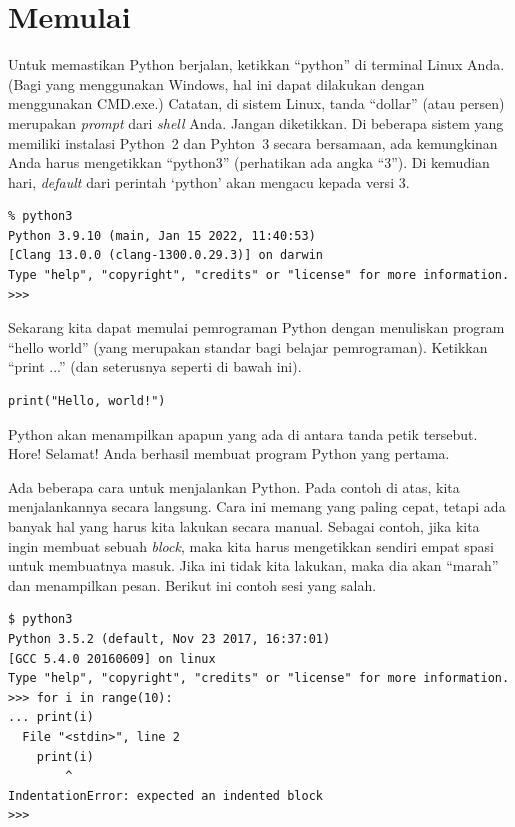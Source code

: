 \section{Memulai}
Untuk memastikan Python berjalan, ketikkan ``python'' di terminal Linux Anda.
(Bagi yang menggunakan Windows, hal ini dapat dilakukan dengan menggunakan
CMD.exe.) Catatan, di sistem Linux, tanda ``dollar'' (atau persen)
merupakan {\em prompt} dari {\em shell} Anda. Jangan diketikkan.
Di beberapa sistem yang memiliki instalasi Python~2 dan Pyhton~3 secara
bersamaan, ada kemungkinan Anda harus mengetikkan ``python3''
(perhatikan ada angka ``3'').
Di kemudian hari, {\em default} dari perintah `python' akan mengacu
kepada versi 3.

\begin{verbatim}
% python3
Python 3.9.10 (main, Jan 15 2022, 11:40:53) 
[Clang 13.0.0 (clang-1300.0.29.3)] on darwin
Type "help", "copyright", "credits" or "license" for more information.
>>> 
\end{verbatim}

Sekarang kita dapat memulai pemrograman Python dengan menuliskan
program ``hello world'' (yang merupakan standar bagi belajar pemrograman).
Ketikkan ``print ...'' (dan seterusnya seperti di bawah ini).

\begin{verbatim}
print("Hello, world!")
\end{verbatim}

Python akan menampilkan apapun yang ada di antara tanda petik tersebut. Hore!
Selamat! Anda berhasil membuat program Python yang pertama.

Ada beberapa cara untuk menjalankan Python. Pada contoh di atas, kita
menjalankannya secara langsung. Cara ini memang yang paling cepat, tetapi ada
banyak hal yang harus kita lakukan secara manual. Sebagai contoh, jika kita
ingin membuat sebuah {\em block}, maka kita harus mengetikkan sendiri empat
spasi untuk membuatnya masuk. Jika ini tidak kita lakukan, maka dia akan
``marah'' dan menampilkan pesan. Berikut ini contoh sesi yang salah.

\begin{verbatim}
$ python3
Python 3.5.2 (default, Nov 23 2017, 16:37:01) 
[GCC 5.4.0 20160609] on linux
Type "help", "copyright", "credits" or "license" for more information.
>>> for i in range(10):
... print(i)
  File "<stdin>", line 2
    print(i)
        ^
IndentationError: expected an indented block
>>> 
\end{verbatim}

